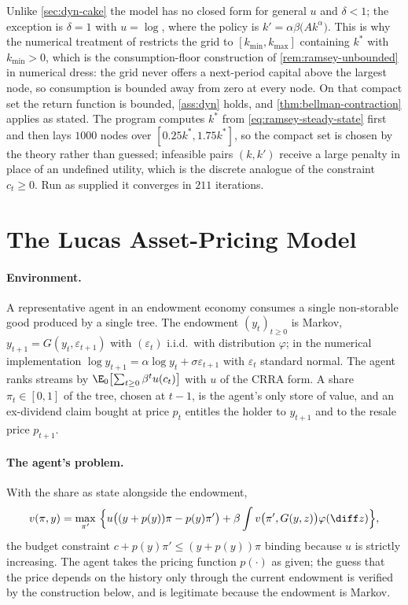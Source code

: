 Unlike \autoref{sec:dyn-cake} the model has no closed form for general $u$ and
$\delta<1$; the exception is $\delta=1$ with $u=\log$, where the policy is
$k'=\alpha\beta\bigl(Ak^{\alpha}\bigr)$. This is why the numerical treatment of
\autocite[slides 37--41]{fukuda2026dynamic} restricts the grid to
$[k_{\min},k_{\max}]$ containing $k^{\ast}$ with $k_{\min}>0$, which is the
consumption-floor construction of \autoref{rem:ramsey-unbounded} in numerical
dress: the grid never offers a next-period capital above the largest node, so
consumption is bounded away from zero at every node. On that compact set the
return
function is bounded, \autoref{ass:dyn} holds, and
\autoref{thm:bellman-contraction} applies as stated. The program
 computes $k^{\ast}$ from
\eqref{eq:ramsey-steady-state} first and then lays $1000$ nodes over
$[0.25k^{\ast},1.75k^{\ast}]$, so the compact set is chosen by the theory rather
than guessed; infeasible pairs $(k,k')$ receive a large penalty in place of an
undefined utility, which is the discrete analogue of the constraint
$c_t\geq0$. Run as supplied it converges in $211$ iterations.

\section{The Lucas Asset-Pricing Model}\label{sec:dyn-lucas}

\paragraph{Environment.} A representative agent in an endowment economy consumes
a single non-storable good produced by a single tree. The endowment
$(y_t)_{t\geq0}$ is Markov, $y_{t+1}=G(y_t,\varepsilon_{t+1})$ with
$(\varepsilon_t)$ i.i.d.\ with distribution $\varphi$; in the numerical
implementation $\log y_{t+1}=\alpha\log y_t+\sigma\varepsilon_{t+1}$ with
$\varepsilon_t$ standard normal. The agent ranks streams by
$\E_0\bigl[\sum_{t\geq0}\beta^{t}u(c_t)\bigr]$ with $u$ of the CRRA form. A share
$\pi_t\in[0,1]$ of the tree, chosen at $t-1$, is the agent's only store of value,
and an ex-dividend claim bought at price $p_t$ entitles the holder to $y_{t+1}$
and to the resale price $p_{t+1}$.

\paragraph{The agent's problem.} With the share as state alongside the endowment,
\begin{equation}\label{eq:lucas-bellman}
	v(\pi,y)=\max_{\pi'}\
	\Bigl\{u\bigl((y+p(y))\pi-p(y)\pi'\bigr)
	+\beta\int v\bigl(\pi',G(y,z)\bigr)\varphi(\diff z)\Bigr\},
\end{equation}
the budget constraint $c+p(y)\pi'\leq(y+p(y))\pi$ binding because $u$ is strictly
increasing. The agent takes the pricing function $p(\cdot)$ as given; the guess
that the price depends on the history only through the current endowment is
verified by the construction below, and is legitimate because the endowment is
Markov.


